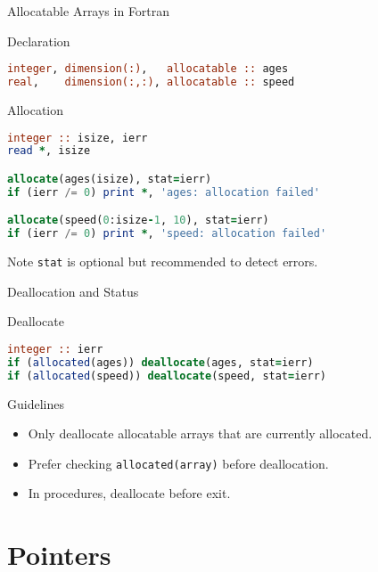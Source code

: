 \begin{frame}[fragile]{Allocatable Arrays in Fortran}
\begin{block}{Declaration}
\begin{lstlisting}[language=Fortran]
integer, dimension(:),   allocatable :: ages
real,    dimension(:,:), allocatable :: speed
\end{lstlisting}
 \end{block}
 \begin{block}{Allocation}
\begin{lstlisting}[language=Fortran]
integer :: isize, ierr
read *, isize

allocate(ages(isize), stat=ierr)
if (ierr /= 0) print *, 'ages: allocation failed'

allocate(speed(0:isize-1, 10), stat=ierr)
if (ierr /= 0) print *, 'speed: allocation failed'
\end{lstlisting}
 \end{block}
 \begin{block}{Note}
   \texttt{stat} is optional but recommended to detect errors.
 \end{block}
\end{frame}


\begin{frame}[fragile]{Deallocation and Status}
 \begin{block}{Deallocate}
\begin{lstlisting}[language=Fortran]
integer :: ierr
if (allocated(ages)) deallocate(ages, stat=ierr)
if (allocated(speed)) deallocate(speed, stat=ierr)
\end{lstlisting}
 \end{block}
 \begin{block}{Guidelines}
   \begin{itemize}
     \item Only deallocate allocatable arrays that are currently allocated.
     \item Prefer checking \texttt{allocated(array)} before deallocation.
     \item In procedures, deallocate before exit.
   \end{itemize}
 \end{block}
\end{frame}



\section{Pointers}

